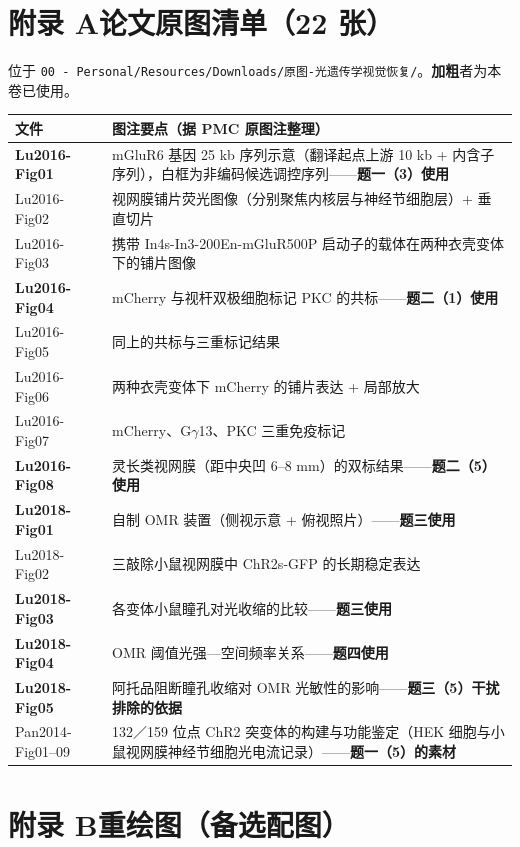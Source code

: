 \documentclass[UTF8,a4paper,11pt]{ctexart}
\begin{document}
\clearpage
\appendix
\section{附录 A\quad 论文原图清单（22 张）}

\noindent 位于 \texttt{00 - Personal/Resources/Downloads/原图-光遗传学视觉恢复/}。\textbf{加粗}者为本卷已使用。

\begin{longtable}{@{}p{2.6cm}p{11.6cm}@{}}
\toprule
\textbf{文件} & \textbf{图注要点（据 PMC 原图注整理）} \\
\midrule
\endhead
\textbf{Lu2016-Fig01} & mGluR6 基因 25 kb 序列示意（翻译起点上游 10 kb + 内含子序列），白框为非编码候选调控序列——\textbf{题一（3）使用} \\
Lu2016-Fig02 & 视网膜铺片荧光图像（分别聚焦内核层与神经节细胞层）+ 垂直切片 \\
Lu2016-Fig03 & 携带 In4s-In3-200En-mGluR500P 启动子的载体在两种衣壳变体下的铺片图像 \\
\textbf{Lu2016-Fig04} & mCherry 与视杆双极细胞标记 PKC 的共标——\textbf{题二（1）使用} \\
Lu2016-Fig05 & 同上的共标与三重标记结果 \\
Lu2016-Fig06 & 两种衣壳变体下 mCherry 的铺片表达 + 局部放大 \\
Lu2016-Fig07 & mCherry、G$\gamma$13、PKC 三重免疫标记 \\
\textbf{Lu2016-Fig08} & 灵长类视网膜（距中央凹 6--8 mm）的双标结果——\textbf{题二（5）使用} \\
\textbf{Lu2018-Fig01} & 自制 OMR 装置（侧视示意 + 俯视照片）——\textbf{题三使用} \\
Lu2018-Fig02 & 三敲除小鼠视网膜中 ChR2s-GFP 的长期稳定表达 \\
\textbf{Lu2018-Fig03} & 各变体小鼠瞳孔对光收缩的比较——\textbf{题三使用} \\
\textbf{Lu2018-Fig04} & OMR 阈值光强—空间频率关系——\textbf{题四使用} \\
\textbf{Lu2018-Fig05} & 阿托品阻断瞳孔收缩对 OMR 光敏性的影响——\textbf{题三（5）干扰排除的依据} \\
Pan2014-Fig01--09 & 132／159 位点 ChR2 突变体的构建与功能鉴定（HEK 细胞与小鼠视网膜神经节细胞光电流记录）——\textbf{题一（5）的素材} \\
\bottomrule
\end{longtable}

\section{附录 B\quad 重绘图（备选配图）}
\end{document}
